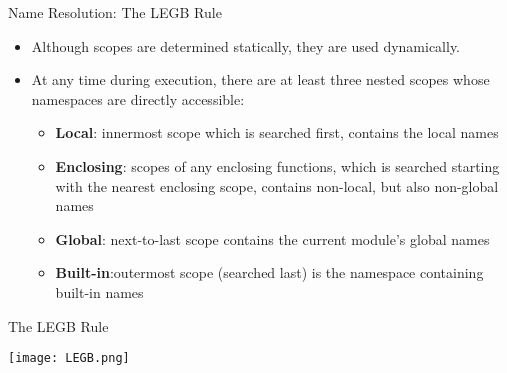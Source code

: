 \documentclass{beamer}
\begin{document}
\begin{frame}{Name Resolution: The LEGB Rule}
\begin{itemize}
\item Although scopes are determined statically, they are used dynamically. 
\item At any time during execution, there are at least three nested scopes whose namespaces are directly accessible:
\begin{itemize}
\item \textbf{\alert{L}ocal}: innermost scope which is searched first, contains the local names
\item \textbf{\alert{E}nclosing}: scopes of any enclosing functions, which is searched starting with the nearest enclosing scope, contains non-local, but also non-global names
\item \textbf{\alert{G}lobal}: next-to-last scope contains the current module's global names
\item \textbf{\alert{B}uilt-in}:outermost scope (searched last) is the namespace containing built-in names
\end{itemize}
\end{itemize}
\end{frame}

\begin{frame}{The LEGB Rule}
\centerline{\texttt{[image: LEGB.png]}}
\end{frame}
\end{document}
